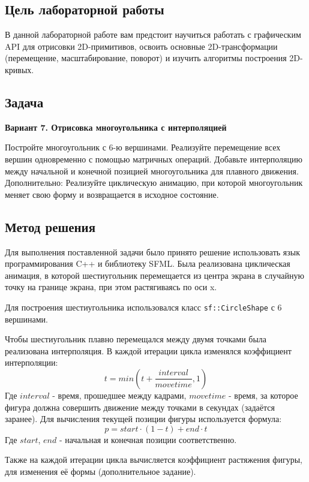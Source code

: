 \documentclass[12pt]{article}
\begin{document}

\subsection*{Цель лабораторной работы}

В данной лабораторной работе вам предстоит научиться работать с графическим API для
отрисовки 2D-примитивов, освоить основные 2D-трансформации (перемещение,
масштабирование, поворот) и изучить алгоритмы построения 2D-кривых.

\subsection*{Задача}

\textbf{Вариант 7. Отрисовка многоугольника с интерполяцией}

Постройте многоугольник с 6-ю вершинами.
Реализуйте перемещение всех вершин одновременно с помощью матричных операций.
Добавьте интерполяцию между начальной и конечной позицией многоугольника для
плавного движения.
Дополнительно: Реализуйте циклическую анимацию, при которой многоугольник меняет
свою форму и возвращается в исходное состояние.

\subsection*{Метод решения}

Для выполнения поставленной задачи было принято решение использовать
язык программирования C++ и библиотеку SFML. Была реализована циклическая анимация,
в которой шестиугольник перемещается из центра экрана в случайную точку на границе экрана,
при этом растягиваясь по оси x.

Для построения шестиугольника использовался класс \texttt{sf::CircleShape} с 6 вершинами.

Чтобы шестиугольник плавно перемещался между двумя точками была реализована интерполяция.
В каждой итерации цикла изменялся коэффициент интерполяции: 
$$t = min(t + {\frac{interval}{movetime}}, 1)$$
Где $interval$ - время, прошедшее между кадрами, $movetime$ - время,
за которое фигура должна совершить движение между точками в секундах (задаётся заранее).
Для вычисления текущей позиции фигуры используется формула:
$$p = start \cdot (1 - t) + end \cdot t$$
Где $start$, $end$ - начальная и конечная позиции соответственно.

Также на каждой итерации цикла вычисляется коэффициент растяжения фигуры,
для изменения её формы (дополнительное задание).
\end{document}

